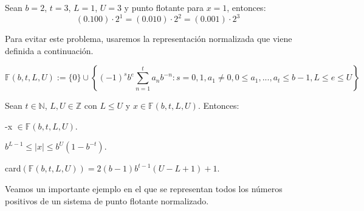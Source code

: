 \begin{ejemplo}
Sean $b = 2$, $t = 3$, $L = 1$, $U = 3$ y punto flotante para $x = 1$, entonces:
\[ (0.100) \cdot 2^1 = (0.010) \cdot 2^2 = (0.001) \cdot 2^3 \]
\end{ejemplo}

Para evitar este problema, usaremos la representación normalizada que viene definida a continuación.

\begin{ndef}
\[ \mathbb{F} (b,t,L,U) := \lbrace 0 \rbrace \cup \left\lbrace (-1)^sb^e \sum_{n=1}^t a_nb^{-n} : s = 0,1, a_1 \neq 0, 0 \leq a_1,...,a_t \leq b - 1, L \leq e \leq U \right\rbrace \]
\end{ndef}

\begin{nprop}
Sean $t \in \mathbb{N}$, $L, U \in \mathbb{Z}$ con $L \leq U$ y $x \in \mathbb{F} (b,t,L,U)$. Entonces:
	\begin{nlist}
	\item -x $\in \mathbb{F} (b,t,L,U)$.
	\item $b^{L-1} \leq \vert x \vert \leq b^U(1 - b^{-t})$.
	\item card$( \mathbb{F} (b,t,L,U)) = 2(b-1)b^{t-1}(U-L+1)+1$.
	\end{nlist}
\end{nprop}

Veamos un importante ejemplo en el que se representan todos los números positivos de un sistema de punto flotante normalizado.

